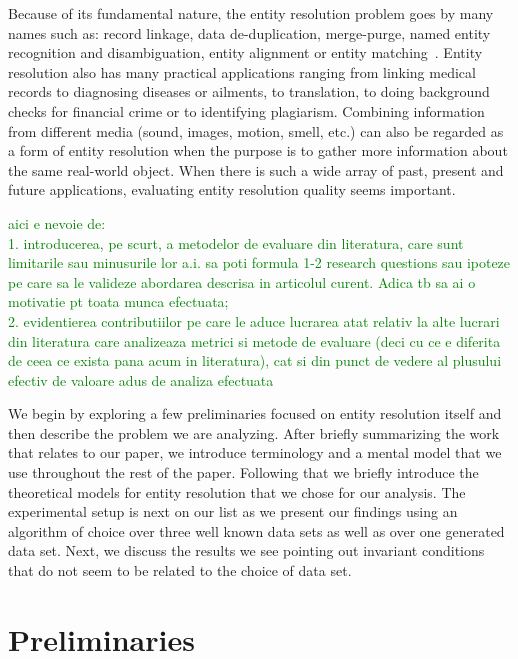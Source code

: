 \documentclass[journal]{IEEEtran}
\begin{document}
    Because of its fundamental nature, the entity resolution problem goes by
    many names such as: record linkage, data de-duplication, merge-purge,
    named entity recognition and disambiguation, entity alignment or entity
    matching~\cite{Tal11,fever2009,alhelbawy2014}.
    Entity resolution also has many practical applications ranging from linking
    medical records to diagnosing diseases or ailments, to translation, to doing
    background checks for financial crime or to identifying plagiarism.
    Combining information from different media (sound, images, motion, smell,
    etc.) can also be regarded as a form of entity resolution when the purpose
    is to gather more information about the same real-world object.
    When there is such a wide array of past, present and future applications,
    evaluating entity resolution quality seems important.
    
    \textcolor{green}{aici e nevoie de:\\
    1. introducerea, pe scurt, a metodelor de evaluare din literatura, care sunt limitarile sau minusurile lor a.i. sa poti formula 1-2 research questions sau ipoteze pe care sa le valideze abordarea descrisa in articolul curent. Adica tb sa ai o motivatie pt toata munca efectuata;\\
    2. evidentierea contributiilor pe care le aduce lucrarea atat relativ la alte lucrari din literatura care analizeaza metrici si metode de evaluare (deci cu ce e diferita de ceea ce exista pana acum in literatura), cat si din punct de vedere al plusului efectiv de valoare adus de analiza efectuata}

    We begin by exploring a few preliminaries focused on entity resolution
    itself and then describe the problem we are analyzing.
    After briefly summarizing the work that relates to our paper, we introduce
    terminology and a mental model that we use throughout the rest of the paper.
    Following that we briefly introduce the theoretical models for entity
    resolution that we chose for our analysis.
    The experimental setup is next on our list as we present our findings using
    an algorithm of choice over three well known data sets as well as over one
    generated data set.
    Next, we discuss the results we see pointing out invariant conditions that
    do not seem to be related to the choice of data set.

    \section{Preliminaries}\label{sec:preliminaries}
\end{document}
